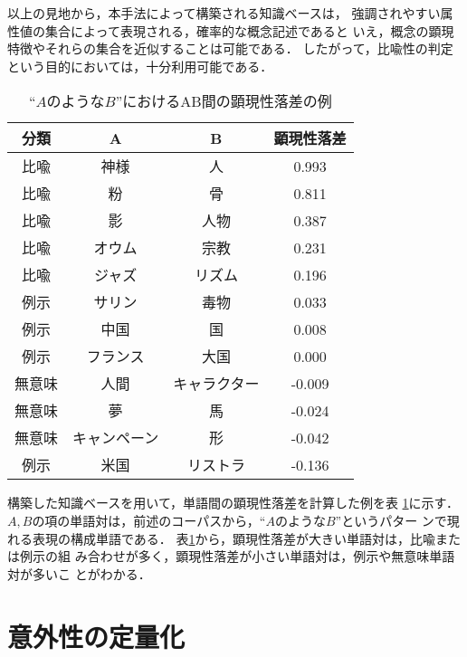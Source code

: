 以上の見地から，本手法によって構築される知識ベースは，
強調されやすい属性値の集合によって表現される，確率的な概念記述であると
いえ，概念の顕現特徴やそれらの集合を近似することは可能である．
したがって，比喩性の判定という目的においては，十分利用可能である．
\begin{table}[tb]
\begin{center}
\caption{``$AのようなB$''におけるAB間の顕現性落差の例}
\label{tbl:gap-ex}
\begin{tabular}{|c|c|c|c|}
\hline
分類	&A	&B 	&顕現性落差\\
\hline
比喩	&神様	&人	&0.993 \\
比喩	&粉	&骨	&0.811 \\
比喩	&影	&人物	&0.387 \\
比喩	&オウム&宗教	&0.231 \\
比喩	&ジャズ&リズム	&0.196 \\
例示 	&サリン	&毒物	&0.033 \\
例示 	&中国	&国	&0.008 \\
例示 	&フランス&大国	&0.000 \\
無意味 	&人間	&キャラクター	&-0.009 \\
無意味 	&夢	&馬	&-0.024 \\
無意味 	&キャンペーン	&形	&-0.042 \\
例示 	&米国	&リストラ&-0.136 \\
\hline
\end{tabular}
\end{center}
\end{table}

構築した知識ベースを用いて，単語間の顕現性落差を計算した例を表
\ref{tbl:gap-ex}に示す．
$A,B$の項の単語対は，前述のコーパスから，``$AのようなB$''というパター
ンで現れる表現の構成単語である．
表\ref{tbl:gap-ex}から，顕現性落差が大きい単語対は，比喩または例示の組
み合わせが多く，顕現性落差が小さい単語対は，例示や無意味単語対が多いこ
とがわかる．

\section{意外性の定量化}
